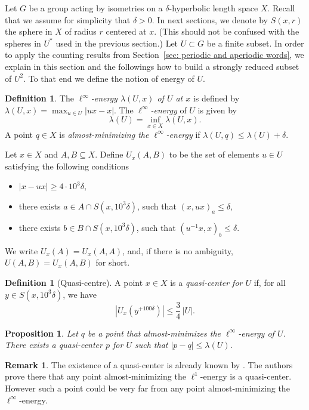 \documentclass[11pt]{article}
\theoremstyle{plain}
\newtheorem{prop}[thm]{Proposition}
\theoremstyle{definition}
\newtheorem{df}[thm]{Definition}
\newtheorem{rem}[thm]{Remark}
\begin{document}
Let $G$ be a group acting by isometries on a $\delta$-hyperbolic length space $X$.
Recall that we assume for simplicity that $\delta > 0$.
In next sections, we denote by $S(x,r)$ the sphere in $X$ of radius $r$ centered at $x$.
(This should not be confused with the spheres in $U^*$ used in the previous section.)
Let $U\subset G$ be a finite subset.
In order to apply the counting results from Section~\ref{sec: periodic and aperiodic words}, we explain in this section and the followings how to build a strongly reduced subset of $U^2$.
To that end we define the notion of energy of $U$.

\begin{df}
The \emph{$\ell^{\infty}$-energy $\lambda(U,x)$ of $U$ at $x$} is defined by
$\lambda(U,x) = \max_{u\in U} |ux-x|$.
The \emph{$\ell^{\infty}$-energy} of $U$ is given by
\[
\lambda(U)=\inf_{x\in X} \lambda(U,x).
\]
A point $q\in X$ is \emph{almost-minimizing the $ \ell^{\infty}$-energy} if $\lambda(U,q)\leqslant \lambda(U)+\delta$.
\end{df}

\label{sec: quasi-centre}
Let $x \in X$ and $A, B \subseteq X$.
Define $U_x(A,B)$ to be the set of elements $u \in U$ satisfying the following conditions
\begin{itemize}
\item $|x - ux| \geq 4 \cdot 10^3\delta$,
\item there exists $a \in A \cap S(x,10^3\delta)$, such that $(x,ux)_{a}\leqslant \delta$,
\item there exists $b \in B \cap S(x,10^3\delta)$, such that $(u^{-1}x,x)_b\leqslant \delta$.
\end{itemize}
We write $U_x(A)=U_x(A,A)$, and, if there is no ambiguity, $U(A,B)=U_x(A,B)$ for short.

\begin{df}[Quasi-centre]
A point $x\in X$ is a \emph{quasi-center for $U$} if, for all $y\in S(x,10^3\delta)$, we have
\[
\left|U_x\left(y^{+100\delta}\right)\right|\leqslant \frac{3}{4}\, |U|.
\]
\end{df}

\begin{prop}\label{P: quasi-centre}
Let $q$ be a point that almost-minimizes the $\ell^{\infty}$-energy of $U$.
There exists a quasi-center $p$ for $U$ such that $| p - q | \leqslant \lambda (U)$.
\end{prop}
\begin{rem} The existence of a quasi-center is already known by \cite{delzant_product_2020}.
The authors prove there that any point almost-minimizing the $\ell^1$-energy is a quasi-center.
However such a point could be very far from any point almost-minimizing the $\ell^\infty$-energy.
\end{rem}
\end{document}
